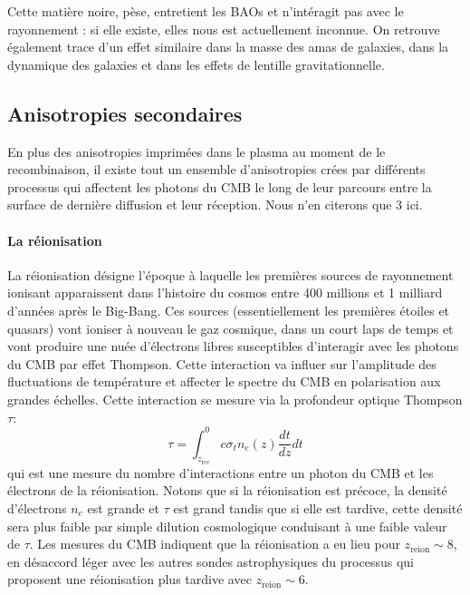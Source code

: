 Cette matière noire, pèse, entretient les BAOs et n'intéragit pas avec le rayonnement : si elle existe, elles nous est actuellement inconnue. On retrouve également trace d'un effet similaire dans la masse des amas de galaxies, dans la dynamique des galaxies et dans les effets de lentille gravitationnelle.

\subsection{Anisotropies secondaires}
En plus des anisotropies imprimées dans le plasma au moment de le recombinaison, il existe tout un ensemble d'anisotropies crées par différents processus qui affectent les photons du CMB le long de leur parcours entre la surface de dernière diffusion et leur réception. Nous n'en citerons que 3 ici.

\paragraph{La réionisation} 
La réionisation désigne l'époque à laquelle les premières sources de rayonnement ionisant apparaissent dans l'histoire du cosmos entre 400 millions et 1 milliard d'années après le Big-Bang. Ces sources (essentiellement les premières étoiles et quasars) vont ioniser à nouveau le gaz cosmique, dans un court laps de temps et vont produire une nuée d'électrons libres susceptibles d'interagir avec les photons du CMB par effet Thompson. Cette interaction va influer sur l'amplitude des fluctuations de température et affecter le spectre du CMB en polarisation aux grandes échelles. Cette interaction se mesure via la profondeur optique Thompson $\tau$:
\begin{equation}
\tau=\int_{z_\mathrm{rec}}^{0} c\sigma_t n_e(z)\frac{dt}{dz}dt
\end{equation}
qui est une mesure du nombre d'interactions entre un photon du CMB et les électrons de la réionisation. Notons que si la réionisation est précoce, la densité d'électrons $n_e$ est grande et $\tau$ est grand tandis que si elle est tardive, cette densité sera plus faible par simple dilution cosmologique conduisant à une faible valeur de $\tau$. Les mesures du CMB indiquent que la réionisation a eu lieu pour $z_\mathrm{reion}\sim8$, en désaccord léger avec les autres sondes astrophysiques du processus qui proposent une réionisation plus tardive avec $z_\mathrm{reion}\sim6$.

